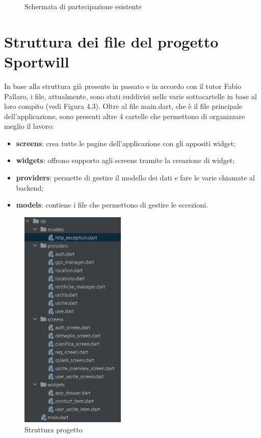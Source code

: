\begin{figure}[htbp]
\begin{minipage}[b]{0.47\textwidth}
		\caption{Schermata di partecipazione esistente}
		\label{fig:Schermata di partecipazione esistente}
	\end{minipage}
\end{figure}
 
 \newpage

\section{Struttura dei file del progetto Sportwill}

In base alla struttura già presente in passato e in accordo con il tutor Fabio Pallaro, i file, attualmente, sono stati suddivisi nelle varie sottocartelle in base al loro compito (vedi Figura 4.3).
Oltre al file main.dart, che è il file principale dell'applicazione, sono presenti altre 4 cartelle che permettono di organizzare meglio il lavoro:
\begin{itemize}
	\item \textbf{screens}: crea tutte le pagine dell'applicazione con gli appositi widget;
	\item \textbf{widgets}: offrono supporto agli screens tramite la creazione di widget;
	\item \textbf{providers}: permette di gestire il modello dei dati e fare le varie chiamate al backend;
	\item \textbf{models}: contiene i file che permettono di gestire le eccezioni.
\end{itemize}
\begin{figure}[htbp]	
	\centering
	\includegraphics[width=5cm]{immagini/struttura.png}
	\caption{Struttura progetto}
	\label{fig:Struttura progetto}
\end{figure}


